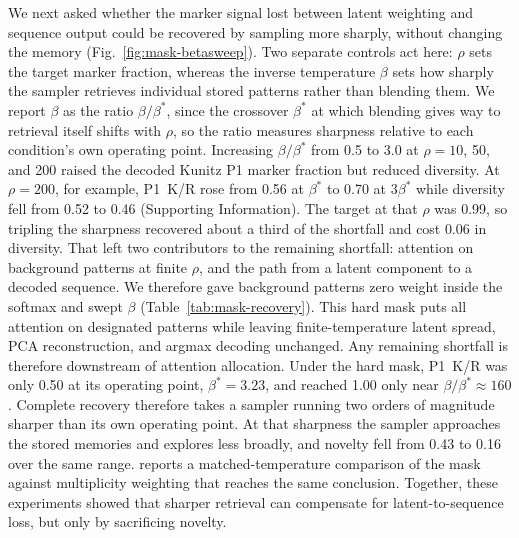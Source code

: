 We next asked whether the marker signal lost between latent weighting and sequence output could
be recovered by sampling more sharply, without changing the memory
(Fig.~\ref{fig:mask-betasweep}). Two separate controls act
here: $\rho$ sets the target marker fraction, whereas the inverse temperature $\beta$ sets how
sharply the sampler retrieves individual stored patterns rather than blending them. We report
$\beta$ as the ratio $\beta/\beta^{*}$, since the crossover $\beta^{*}$ at which blending gives
way to retrieval itself shifts with $\rho$, so the ratio measures sharpness relative to each
condition's own operating point. Increasing $\beta/\beta^{*}$ from 0.5 to 3.0 at
$\rho=10$, 50, and 200 raised the decoded Kunitz P1 marker fraction but reduced diversity. At
$\rho=200$, for example, P1~K/R rose from 0.56 at $\beta^{*}$ to 0.70 at $3\beta^{*}$ while
diversity fell from 0.52 to 0.46 (Supporting Information). The target at that $\rho$ was 0.99,
so tripling the sharpness recovered about a third of the shortfall and cost 0.06 in diversity.
That left two contributors to the remaining shortfall: attention on background patterns at
finite $\rho$, and the path from a latent component to a decoded sequence. We therefore gave background patterns
zero weight inside the softmax and swept $\beta$ (Table~\ref{tab:mask-recovery}). This hard
mask puts all attention on designated patterns while leaving finite-temperature latent spread,
PCA reconstruction, and argmax decoding unchanged. Any remaining shortfall is therefore
downstream of attention allocation.
Under the hard mask, P1~K/R was only 0.50 at its operating point, $\beta^{*}=3.23$,
and reached 1.00 only near $\beta/\beta^{*}\approx160$. Complete recovery therefore takes a
sampler running two orders of magnitude sharper than its own operating point. At that sharpness
the sampler approaches the stored memories and explores less broadly,
and novelty fell from 0.43 to 0.16 over the same range.  reports a
matched-temperature comparison of the mask against multiplicity weighting that reaches the same
conclusion. Together, these experiments showed that
sharper retrieval can compensate for latent-to-sequence loss, but only by sacrificing novelty.

\DisplayHardMask

